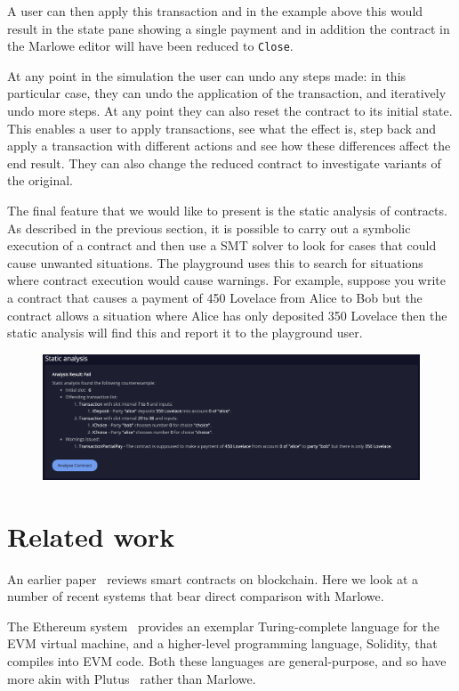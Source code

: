 \documentclass[runningheads]{llncs}
\renewcommand{\lstinline}[1]{\texttt{#1}}
\begin{document}
\noindent
A user can then apply this transaction and in the example above this would result in the state pane showing a single payment and in addition the contract in the Marlowe editor will have been reduced to \lstinline{Close}.

At any point in the simulation the user can undo any steps made: in this particular case, they can undo the application of the transaction, and iteratively undo more steps. At any point they can also reset the contract to its initial state. This enables a user to apply transactions, see what the effect is, step back and apply a transaction with different actions and see how these differences affect the end result. They can also change the reduced contract to investigate variants of the original.

The final feature that we would like to present is the static analysis of contracts. As described in the previous section, it is possible to carry out a symbolic execution of a contract and then use a SMT solver to look for cases that could cause unwanted situations. The playground uses this to search for situations where contract execution would cause warnings. For example, suppose you write a contract that causes a payment of 450 Lovelace from Alice to Bob but the contract allows a situation where Alice has only deposited 350 Lovelace then the static analysis will find this and report it to the playground user.
\begin{figure}
    \includegraphics[width=1\textwidth]{static_analysis.png}
\end{figure}

\section{Related work}
\label{sec:related}

An earlier paper~\cite{cryptoeprint:2016:1156} reviews smart contracts on blockchain. Here we look at a number of recent systems that bear direct comparison with Marlowe.

The Ethereum system~\cite{wood2014ethereum} provides an exemplar Turing-complete language for  the EVM virtual machine, and a higher-level programming language, Solidity, that compiles into EVM code. Both these languages are general-purpose, and so have more akin with Plutus~\cite{PlutusPlatform} rather than Marlowe.
\end{document}
